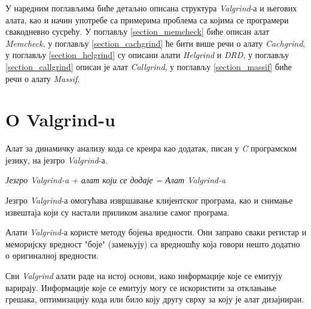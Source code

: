 \documentclass[12pt,oneside]{memoir}
\begin{document}
\indent У наредним поглављима биће детаљно описана структура \textit{Valgrind}-а и његових алата, као и начин употребе са примерима проблема са којима се програмери свакодневно сусрећу. У поглављу \ref{section_memcheck} биће описан алат \textit{Memcheck}, у поглављу \ref{section_cachgrind} ће бити више речи о алату \textit{Cachgrind}, у поглављу \ref{section_helgrind} су описани алати \textit{Helgrind} и \textit{DRD}, у поглављу \ref{section_callgrind} описан је алат \textit{Callgrind}, у поглављу \ref{section_massif} биће речи о алату \textit{Massif}.

\section{O Valgrind-u}

\indent Алат за динамичку анализу кода се креира као додатак, писан у \textit{C} програмском језику, на језгро \textit{Valgrind}-а. 


\begin{center}
\textit{Језгро Valgrind-a + алат који се додаје = Алат Valgrind-a} 
\end{center}


\indent Језгро \textit{Valgrind}-а омогућава извршавање клијентског програма, као и снимање извештаја који су настали приликом анализе самог програма. 

\indent Алати \textit{Valgrind}-а користе методу бојења вредности. Они заправо сваки регистар и меморијску вредност "боје" (замењују) са вредношћу која говори нешто додатно о оригиналној вредности. 

\indent Сви \textit{Valgrind} алати раде на истој основи, иако информације које се емитују варирају. Информације које се емитују могу се искористити за отклањање грешака, оптимизацију кода или било коју другу сврху за коју је алат дизајниран.
\end{document}
